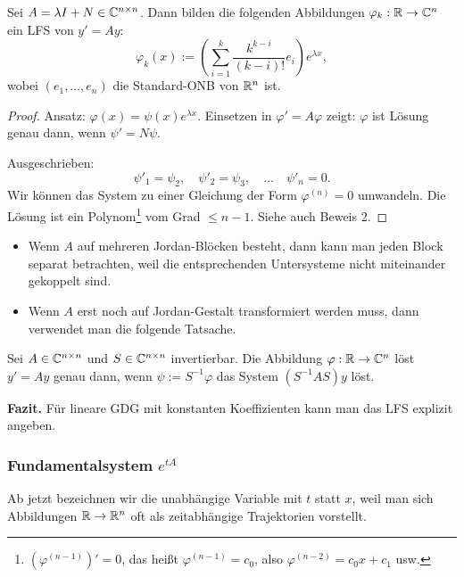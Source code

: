\begin{thm}
  Sei $A = \lambda I + N \in \mathbb{C}^{n \times n}$. Dann bilden die folgenden
  Abbildungen $\varphi_k: \mathbb{R} \to \mathbb{C}^n$ ein LFS von $y' = A y$:
  \[ \varphi_k(x) := \left(\sum_{i=1}^k \frac{k^{k-i}}{(k-i)!} e_i\right)
    e^{\lambda x}, \]
  wobei $(e_1, \ldots, e_n)$ die Standard-ONB von $\mathbb{R}^n$ ist.
\end{thm}

\begin{proof}
  Ansatz: $\varphi(x) = \psi(x) e^{\lambda x}$. Einsetzen in $\varphi' = A
  \varphi$ zeigt: $\varphi$ ist Lösung genau dann, wenn $\psi' = N\psi$.
  
  Ausgeschrieben:
  \[ \psi'_1 = \psi_2, \quad \psi'_2 = \psi_3, \quad \ldots \quad \psi'_n =
    0. \]
  Wir können das System zu einer Gleichung der Form $\varphi^{(n)}=0$ umwandeln.
  Die Lösung ist ein Polynom\footnote{%
    $(\varphi^{(n-1)})' = 0$, das heißt $\varphi^{(n-1)}=c_0$, also
    $\varphi^{(n-2)} = c_0 x + c_1$ usw.
  } vom Grad $\le n-1$. Siehe auch Beweis 2.
\end{proof}

\begin{rmrk}
  \begin{itemize}
    \item Wenn $A$ auf mehreren Jordan-Blöcken besteht, dann kann man jeden
      Block separat betrachten, weil die entsprechenden Untersysteme nicht
      miteinander gekoppelt sind.
    \item Wenn $A$ erst noch auf Jordan-Gestalt transformiert werden muss, dann
      verwendet man die folgende Tatsache.
  \end{itemize}
\end{rmrk}

\begin{rmrk}
  Sei $A \in \mathbb{C}^{n \times n}$ und $S \in \mathbb{C}^{n \times n}$
  invertierbar. Die Abbildung $\varphi:\mathbb{R} \to \mathbb{C}^n$ löst $y'=Ay$ genau
  dann, wenn $\psi := S^{-1} \varphi$ das System $(S^{-1} A S)y$ löst.
\end{rmrk}

\textbf{Fazit.} Für lineare GDG mit konstanten Koeffizienten kann man das LFS explizit
angeben.

\subsubsection{Fundamentalsystem \texorpdfstring{$e^{tA}$}{exp(tA)}}
Ab jetzt bezeichnen wir die unabhängige Variable mit $t$ statt $x$, weil man
sich Abbildungen $\mathbb{R} \to \mathbb{R}^n$ oft als zeitabhängige Trajektorien
vorstellt.


